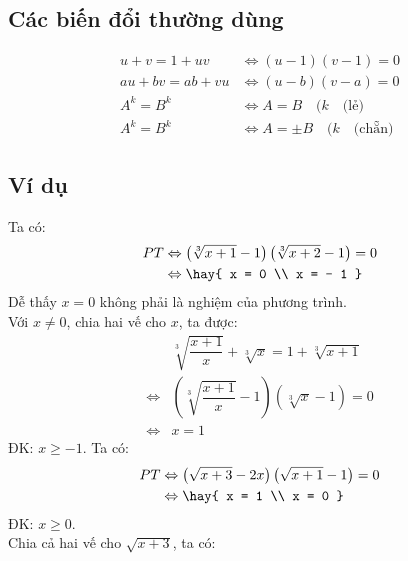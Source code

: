 \subsection{Các biến đổi thường dùng }
\begin{align}
u + v = 1 + uv &\Leftrightarrow \left( {u - 1} \right)\left( {v - 1} \right) = 0\\
au + bv = ab + vu &\Leftrightarrow \left( {u - b} \right)\left( {v - a} \right) = 0\\
A^k=B^k & \Leftrightarrow A=B \quad (k \quad \text{(lẻ)} \\
A^k=B^k & \Leftrightarrow A=\pm B \quad (k \quad \text{(chẵn)} 
\end{align}
\subsection{Ví dụ}
\hda
Ta có:
\begin{align*} PT & \Leftrightarrow \left( {\sqrt[3]{{x + 1}} - 1} \right)\left( {\sqrt[3]{{x + 2}} - 1} \right) = 0 \\
& \Leftrightarrow \hay{
 x = 0 \\ 
 x = - 1 } \end{align*}
\hda
Dễ thấy $x=0$ không phải là nghiệm của phương trình.\\
Với $x \neq 0$, chia hai vế cho $x$, ta được:
\begin{align*}
& \sqrt[3]{{\dfrac{{x + 1}}{x}}} + \sqrt[3]{x} = 1 + \sqrt[3]{{x + 1}} \\
\Leftrightarrow & \left( {\sqrt[3]{{\dfrac{{x + 1}}{x}}} - 1} \right)\left( {\sqrt[3]{x} - 1} \right) = 0 \\ \Leftrightarrow & x = 1
\end{align*}
\hda
ĐK: $x \ge - 1$. Ta có:
\begin{align*}
PT & \Leftrightarrow \left( {\sqrt {x + 3} - 2x} \right)\left( {\sqrt {x + 1} - 1} \right) = 0 \\ & \Leftrightarrow \hay{ x = 1 \\  x = 0 }
\end{align*}
\hda
ĐK: $x \ge 0$. \\
Chia cả hai vế cho $\sqrt {x + 3} $, ta có:
